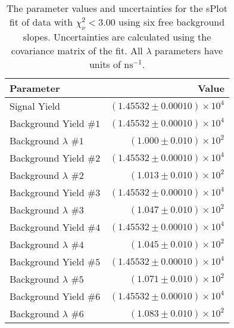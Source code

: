 
\begin{table}[ht]
    \begin{center}
        \begin{tabular}{lr}\toprule
            Parameter & Value \\\midrule
            Signal Yield & $(1.45532 \pm 0.00010) \times 10^{4}$ \\
            Background Yield $\#1$ & $(1.45532 \pm 0.00010) \times 10^{4}$ \\
            Background $\lambda$ $\#1$ & $(1.000 \pm 0.010) \times 10^{2}$ \\
            Background Yield $\#2$ & $(1.45532 \pm 0.00010) \times 10^{4}$ \\
            Background $\lambda$ $\#2$ & $(1.013 \pm 0.010) \times 10^{2}$ \\
            Background Yield $\#3$ & $(1.45532 \pm 0.00010) \times 10^{4}$ \\
            Background $\lambda$ $\#3$ & $(1.047 \pm 0.010) \times 10^{2}$ \\
            Background Yield $\#4$ & $(1.45532 \pm 0.00010) \times 10^{4}$ \\
            Background $\lambda$ $\#4$ & $(1.045 \pm 0.010) \times 10^{2}$ \\
            Background Yield $\#5$ & $(1.45532 \pm 0.00010) \times 10^{4}$ \\
            Background $\lambda$ $\#5$ & $(1.071 \pm 0.010) \times 10^{2}$ \\
            Background Yield $\#6$ & $(1.45532 \pm 0.00010) \times 10^{4}$ \\
            Background $\lambda$ $\#6$ & $(1.083 \pm 0.010) \times 10^{2}$ \\\bottomrule
        \end{tabular}
        \caption{The parameter values and uncertainties for the sPlot fit of data with $\chi^2_\nu < 3.00$ using six free background slopes. Uncertainties are calculated using the covariance matrix of the fit. All $\lambda$ parameters have units of $\si{\nano\second}^{-1}$.}\label{tab:splot-fit-results-chisqdof-3.00-free-6}
    \end{center}
\end{table}
